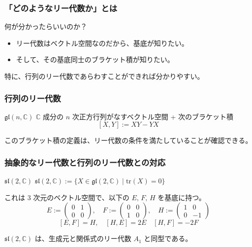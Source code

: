 \documentclass{beamer}
\begin{document}
\begin{frame}
    \frametitle{「どのようなリー代数か」とは}

    何が分かったらいいのか？

    \begin{itemize}
        \item リー代数はベクトル空間なのだから、基底が知りたい。
        \item そして、その基底同士のブラケット積が知りたい。
    \end{itemize}

    \bigskip

    特に、行列のリー代数であらわすことができれば分かりやすい。
\end{frame}

\begin{frame}
    \frametitle{行列のリー代数}

    \begin{block}{\(\mathfrak{gl}(n,\mathbb{C})\)}
        \(\mathbb{C}\) 成分の \(n\) 次正方行列がなすベクトル空間 + 次のブラケット積
        \[
            [X, Y] := XY - YX
        \]
    \end{block}

    このブラケット積の定義は、リー代数の条件を満たしていることが確認できる。
\end{frame}

\begin{frame}
    \frametitle{抽象的なリー代数と行列のリー代数との対応}

    \begin{block}{\(\mathfrak{sl}(2,\mathbb{C})\)}
        \(\mathfrak{sl}(2,\mathbb{C}) := \{ X \in \mathfrak{gl}(2,\mathbb{C}) \mid \mathrm{tr}(X) = 0 \} \)
    \end{block}

    これは \(3\) 次元のベクトル空間で、以下の \(E,\, F,\, H\) を基底に持つ。
    \[
        E := \begin{pmatrix}
            0 & 1 \\
            0 & 0
        \end{pmatrix}, \quad
        F := \begin{pmatrix}
            0 & 0 \\
            1 & 0
        \end{pmatrix}, \quad
        H := \begin{pmatrix}
            1 & 0  \\
            0 & -1
        \end{pmatrix}
    \]
    \[
        [E, F] = H, \quad [H, E] = 2E \quad [H, F] = -2F
    \]

    \(\mathfrak{sl}(2,\mathbb{C})\) は、生成元と関係式のリー代数 \(A_1\) と同型である。
\end{frame}
\end{document}
